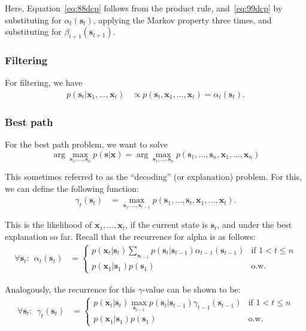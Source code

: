 Here, Equation~\eqref{eq:88dcp} follows from the product rule, and~\eqref{eq:99dcp} by substituting for $\alpha_t(\textbf{s}_t)$, applying the Markov property three times, and substituting for  $\beta_{t+1}(\textbf{s}_{t+1})$.

\subsubsection{Filtering}

For filtering, we have
%
\begin{align}
  p(\textbf{s}_{t} | \textbf{x}_1, ..., \textbf{x}_t) & \propto p(\textbf{s}_{t} , \textbf{x}_1, ..., \textbf{x}_t)= \alpha_t(\textbf{s}_t).
 \end{align}

\subsubsection{Best path}

For the best path problem, we want to solve
%
$$
\arg\max_{\textbf{s}_1,\ldots,\textbf{s}_n}
p(\textbf{s}|\textbf{x})=\arg\max_{\textbf{s}_1,\ldots,\textbf{s}_n}p(\textbf{s}_1,\ldots,\textbf{s}_n,
\textbf{x}_1,\ldots,\textbf{x}_n)
$$

This sometimes referred to as the ``decoding'' (or explanation) problem. For this, we can define
the following function:
%
\begin{align}
\gamma_t(\textbf{s}_t)&= \max_{\textbf{s}_1,\ldots,\textbf{s}_{t-1}}
p(\textbf{s}_1,\ldots,\textbf{s}_t,\textbf{x}_1,\ldots,\textbf{x}_t).
\end{align}

This is the likelihood of $\textbf{x}_1,\ldots,\textbf{x}_t$, if the current state is $\textbf{s}_t$, and under the best explanation so far.
%
Recall that the recurrence for alpha is as follows:
\begin{align*}
\forall \textbf{s}_t:\ \ 
\alpha_t(\textbf{s}_t)&=
\left\{
\begin{array}{ll}
p(\textbf{x}_t| \textbf{s}_t)\sum_{\textbf{s}_{t-1}} p(\textbf{s}_t|\textbf{s}_{t-1})\alpha_{t-1}(\textbf{s}_{t-1}) &\mbox{if $1<t\leq n$}
\\
p(\textbf{x}_1| \textbf{s}_1)p(\textbf{s}_1) &\mbox{o.w.}
\end{array}
\right.
\end{align*}



Analogously, the recurrence for this $\gamma$-value can be shown to be:
%
\begin{align}
\forall \textbf{s}_t:\ \ 
\gamma_t(\textbf{s}_t)&=\left\{
\begin{array}{ll}
p(\textbf{x}_t| \textbf{s}_t)\max_{\textbf{s}_{t-1}} p(\textbf{s}_t|\textbf{s}_{t-1})\gamma_{t-1}(\textbf{s}_{t-1}) &\mbox{if $1<t\leq n$}\\
p(\textbf{x}_1| \textbf{s}_1)p(\textbf{s}_1) &\mbox{o.w.}
\end{array}
\right.
\end{align}

